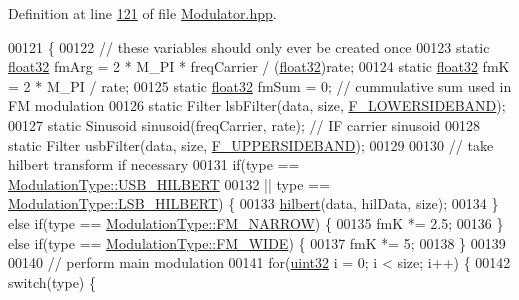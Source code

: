 Definition at line \hyperlink{Modulator_8hpp_source_l00121}{121} of file \hyperlink{Modulator_8hpp_source}{Modulator.\+hpp}.


\begin{DoxyCode}
00121                         \{
00122         \textcolor{comment}{// these variables should only ever be created once}
00123         \textcolor{keyword}{static} \hyperlink{definitions_8hpp_aacdc525d6f7bddb3ae95d5c311bd06a1}{float32} fmArg = 2 * M\_PI * freqCarrier / (\hyperlink{definitions_8hpp_aacdc525d6f7bddb3ae95d5c311bd06a1}{float32})rate;
00124         \textcolor{keyword}{static} \hyperlink{definitions_8hpp_aacdc525d6f7bddb3ae95d5c311bd06a1}{float32} fmK = 2 * M\_PI / rate;
00125         \textcolor{keyword}{static} \hyperlink{definitions_8hpp_aacdc525d6f7bddb3ae95d5c311bd06a1}{float32} fmSum = 0;  \textcolor{comment}{// cummulative sum used in FM modulation}
00126         \textcolor{keyword}{static} Filter lsbFilter(data, size, \hyperlink{namespaceradio_a0ffd57d5a11ff70a1f55dbdc8ebe098d}{F\_LOWERSIDEBAND});
00127         \textcolor{keyword}{static} Sinusoid sinusoid(freqCarrier, rate);  \textcolor{comment}{// IF carrier sinusoid}
00128         \textcolor{keyword}{static} Filter usbFilter(data, size, \hyperlink{namespaceradio_a0ec4548711b6d6ed6867c70b3fc2a413}{F\_UPPERSIDEBAND});
00129 
00130         \textcolor{comment}{// take hilbert transform if necessary}
00131         \textcolor{keywordflow}{if}(type == \hyperlink{namespaceradio_a46fb7299001138f28b7f69975c58399ea1b14284e455bf5c311de662665312d13}{ModulationType::USB\_HILBERT}
00132                 || type == \hyperlink{namespaceradio_a46fb7299001138f28b7f69975c58399ea18f970daa5b5a8f72cbd45f7b49a6b6a}{ModulationType::LSB\_HILBERT}) \{
00133             \hyperlink{namespaceradio_a285a47b4ed81e5662d2b6b4bae0188d0}{hilbert}(data, hilData, size);
00134         \} \textcolor{keywordflow}{else} \textcolor{keywordflow}{if}(type == \hyperlink{namespaceradio_a46fb7299001138f28b7f69975c58399ea7b4b1e7876b8d9de5b77b9264fbe556a}{ModulationType::FM\_NARROW}) \{
00135             fmK *= 2.5;
00136         \} \textcolor{keywordflow}{else} \textcolor{keywordflow}{if}(type == \hyperlink{namespaceradio_a46fb7299001138f28b7f69975c58399eafabee3b32b363b14950cb5f5b61e998c}{ModulationType::FM\_WIDE}) \{
00137             fmK *= 5;
00138         \}
00139 
00140         \textcolor{comment}{// perform main modulation}
00141         \textcolor{keywordflow}{for}(\hyperlink{definitions_8hpp_a1134b580f8da4de94ca6b1de4d37975e}{uint32} i = 0; i < size; i++) \{
00142             \textcolor{keywordflow}{switch}(type) \{

\end{DoxyCode}
